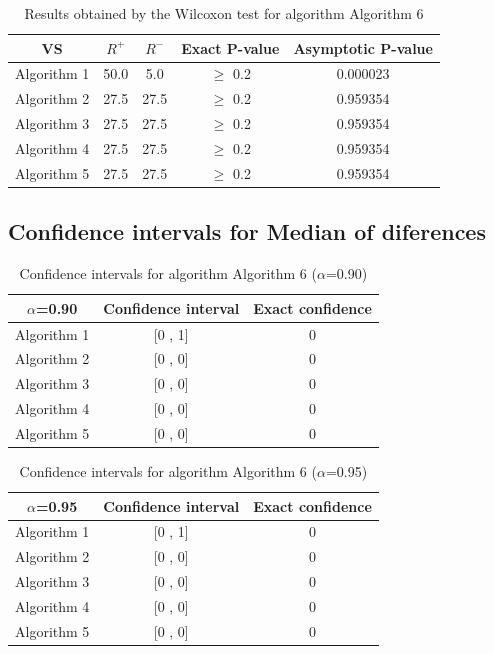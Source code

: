 \documentclass[a4paper,10pt]{article}
\begin{document}
\begin{table}[!htp]
\centering\small
\begin{tabular}{
|c|c|c|c|c|}
\hline
 VS & $R^{+}$ & $R^{-}$ & Exact P-value & Asymptotic P-value \\ \hline 
Algorithm 1 & 50.0 & 5.0 & $\geq$ 0.2 & 0.000023\\ \hline 
Algorithm 2 & 27.5 & 27.5 & $\geq$ 0.2 & 0.959354\\ \hline 
Algorithm 3 & 27.5 & 27.5 & $\geq$ 0.2 & 0.959354\\ \hline 
Algorithm 4 & 27.5 & 27.5 & $\geq$ 0.2 & 0.959354\\ \hline 
Algorithm 5 & 27.5 & 27.5 & $\geq$ 0.2 & 0.959354\\ \hline 

\end{tabular}
\caption{Results obtained by the Wilcoxon test for algorithm Algorithm 6}
\end{table}

\subsection{Confidence intervals for Median of diferences}

\begin{table}[!htp]
\centering\small
\begin{tabular}{
|c|c|c|}
\hline
 $\alpha$=0.90 & Confidence interval & Exact confidence \\ \hline 
Algorithm 1 & [0 , 1] & 0\\ \hline 
Algorithm 2 & [0 , 0] & 0\\ \hline 
Algorithm 3 & [0 , 0] & 0\\ \hline 
Algorithm 4 & [0 , 0] & 0\\ \hline 
Algorithm 5 & [0 , 0] & 0\\ \hline 

\end{tabular}
\caption{Confidence intervals for algorithm Algorithm 6 ($\alpha$=0.90)}
\end{table}
\begin{table}[!htp]
\centering\small
\begin{tabular}{
|c|c|c|}
\hline
 $\alpha$=0.95 & Confidence interval & Exact confidence \\ \hline 
Algorithm 1 & [0 , 1] & 0\\ \hline 
Algorithm 2 & [0 , 0] & 0\\ \hline 
Algorithm 3 & [0 , 0] & 0\\ \hline 
Algorithm 4 & [0 , 0] & 0\\ \hline 
Algorithm 5 & [0 , 0] & 0\\ \hline 

\end{tabular}
\caption{Confidence intervals for algorithm Algorithm 6 ($\alpha$=0.95)}
\end{table}

 \clearpage 
\end{document}
